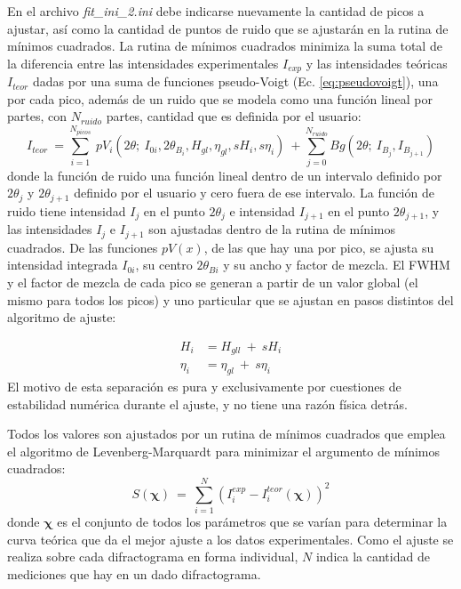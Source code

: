 En el archivo \textit{fit\_ini\_2.ini} debe indicarse nuevamente la cantidad de picos a ajustar, así como la cantidad de puntos de ruido que se ajustarán en la rutina de mínimos cuadrados.
La rutina de mínimos cuadrados minimiza la suma total de la diferencia entre las intensidades experimentales $I_{exp}$ y las intensidades teóricas $I_{teor}$ dadas por una suma de funciones pseudo-Voigt (Ec. \ref{eq:pseudovoigt}), una por cada pico, además de un ruido que se modela como una función lineal por partes, con $N_{ruido}$ partes, cantidad que es definida por el usuario:
\begin{equation}
  I_{teor} \ = \sum_{i=1}^{N_{picos}} \ pV_i (2\theta; \ I_{0i}, 2\theta_{B_i}, H_{gl}, \eta_{gl}, sH_i, s\eta_i) \ + \sum_{j=0}^{N_{ruido}} Bg(2\theta; \ I_{B_j}, I_{B_{j+1}})
  \label{eq:Iteor}
\end{equation}
\noindent
donde la función de ruido una función lineal dentro de un intervalo definido por $2\theta_j$ y $2\theta_{j+1}$ definido por el usuario y cero fuera de ese intervalo.
La función de ruido tiene intensidad $I_j$ en el punto $2\theta_j$ e intensidad $I_{j+1}$ en el punto $2\theta_{j+1}$, y las intensidades $I_j$ e $I_{j+1}$ son ajustadas dentro de la rutina de mínimos cuadrados.
De las funciones $pV(x)$, de las que hay una por pico, se ajusta su intensidad integrada $I_{0i}$, su centro $2\theta_{Bi}$ y su ancho y factor de mezcla.
El FWHM y el factor de mezcla de cada pico se generan a partir de un valor global (el mismo para todos los picos) y uno particular que se ajustan en pasos distintos del algoritmo de ajuste:

\begin{align}
  H_i & = H_{gll} \ + \ sH_i \nonumber \\
  \eta_i & =  \eta_{gl} \ + \ s\eta_i
  \label{eq:global}
\end{align}
\noindent
El motivo de esta separación es pura y exclusivamente por cuestiones de estabilidad numérica durante el ajuste, y no tiene una razón física detrás.

Todos los valores son ajustados por un rutina de mínimos cuadrados que emplea el algoritmo de Levenberg-Marquardt\cite{wiki:Levenberg} para minimizar el argumento de mínimos cuadrados:
\begin{equation}
  S(\mathbf{\chi}) \ = \ \sum_{i=1}^{N} (I^{exp}_i - I^{teor}_i(\mathbf{\chi}))^2
  \label{eq:argmin}
\end{equation}
\noindent
donde $\mathbf{\chi}$ es el conjunto de todos los parámetros que se varían para determinar la curva teórica que da el mejor ajuste a los datos experimentales.
Como el ajuste se realiza sobre cada difractograma en forma individual, $N$ indica la cantidad de mediciones que hay en un dado difractograma.

